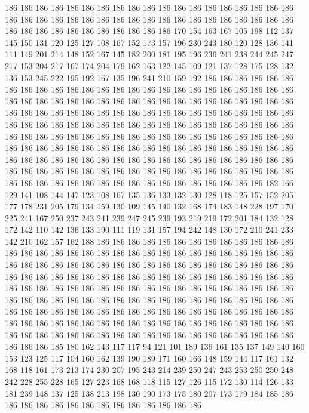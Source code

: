 186 186 186 186 186 186 186 186 186 186 186 186 186 186 186 186 186 186 186 186
186 186 186 186 186 186 186 186 186 186 186 186 186 186 186 186 186 186 186 186
186 186 186 186 186 186 186 186 186 170 154 163 167 105 198 112 137 145 150 131
120 125 127 108 167 152 173 157 196 230 243 180 120 128 136 141 111 149 201 214
148 152 167 145 182 200 181 195 196 236 241 238 244 245 247 217 153 204 217 167
174 204 179 162 163 122 145 109 121 137 128 175 128 132 136 153 245 222 195 192
167 135 196 241 210 159 192 186 186 186 186 186 186 186 186 186 186 186 186 186
186 186 186 186 186 186 186 186 186 186 186 186 186 186 186 186 186 186 186 186
186 186 186 186 186 186 186 186 186 186 186 186 186 186 186 186 186 186 186 186
186 186 186 186 186 186 186 186 186 186 186 186 186 186 186 186 186 186 186 186
186 186 186 186 186 186 186 186 186 186 186 186 186 186 186 186 186 186 186 186
186 186 186 186 186 186 186 186 186 186 186 186 186 186 186 186 186 186 186 186
186 186 186 186 186 186 186 186 186 186 186 186 186 186 186 186 186 186 186 186
186 186 186 186 186 186 186 186 186 186 186 186 186 186 186 186 186 186 186 186
186 186 186 186 186 186 186 186 186 186 186 186 186 186 186 186 186 186 186 186
186 186 182 166 129 141 108 144 147 123 108 167 135 136 133 132 130 128 118 125
157 152 205 177 178 231 205 179 134 159 130 109 145 140 132 168 174 183 148 228
197 170 225 241 167 250 237 243 241 239 247 245 239 193 219 219 172 201 184 132
128 172 142 110 142 136 133 190 111 119 131 157 194 242 148 130 172 210 241 233
142 210 162 157 162 188 186 186 186 186 186 186 186 186 186 186 186 186 186 186
186 186 186 186 186 186 186 186 186 186 186 186 186 186 186 186 186 186 186 186
186 186 186 186 186 186 186 186 186 186 186 186 186 186 186 186 186 186 186 186
186 186 186 186 186 186 186 186 186 186 186 186 186 186 186 186 186 186 186 186
186 186 186 186 186 186 186 186 186 186 186 186 186 186 186 186 186 186 186 186
186 186 186 186 186 186 186 186 186 186 186 186 186 186 186 186 186 186 186 186
186 186 186 186 186 186 186 186 186 186 186 186 186 186 186 186 186 186 186 186
186 186 186 186 186 186 186 186 186 186 186 186 186 186 186 186 186 186 186 186
186 186 186 186 186 186 186 186 186 186 186 186 186 186 185 180 162 143 117 117
94 121 101 189 136 161 135 137 149 140 160 153 123 125 117 104 160 162 139 190
189 171 160 166 148 159 144 117 161 132 168 118 161 173 213 174 230 207 195 243
214 239 250 247 243 253 250 250 248 242 228 255 228 165 127 223 168 168 118 115
127 126 115 172 130 114 126 133 181 239 148 137 125 138 213 198 130 190 173 175
180 207 173 179 184 185 186 186 186 186 186 186 186 186 186 186 186 186 186 186

